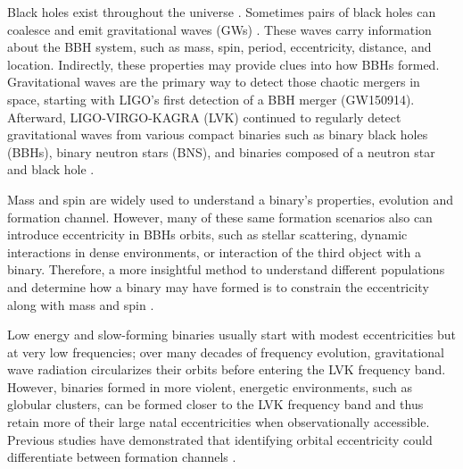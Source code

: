 \documentclass[twocolumn,prd,nofootinbib]{revtex4}
\begin{document}
Black holes exist throughout the universe \cite{Frolic_BH_Book_2011}.   Sometimes pairs of black holes can coalesce and emit gravitational waves (GWs) \cite{Frolic_BH_Book_2011,Indrajit_GW_intro_1999}. These waves carry information about the BBH system, such as mass, spin, period, eccentricity, distance, and location. Indirectly, these properties may provide clues into how BBHs formed.  Gravitational waves are the primary way to detect those chaotic mergers in space, starting with LIGO's \cite{LIGO_2015} first detection of a BBH merger (GW150914). Afterward, LIGO-VIRGO-KAGRA (LVK) \cite{LIGO_2015, VIRGO_2012, Virgo-2015,kagra-2013} continued to regularly detect gravitational waves from various compact binaries such as binary black holes (BBHs), binary neutron stars (BNS), and binaries composed of a neutron star and black hole \cite{gwtc-1-2019,gwtc-2-2020,gwtc-2.1-2021,gwtc-3-2021}.


Mass and spin are widely used to understand a binary's properties, evolution and formation channel.  
However, many of these same formation scenarios also can introduce eccentricity in BBHs orbits, such as stellar scattering, dynamic interactions in dense environments, or interaction of the third object with a binary. Therefore, a more insightful method to understand different populations and determine how a binary may have formed is to constrain the eccentricity along with mass and spin \cite{Rod-2018, zevin-samsing-2019, samsing-2018, Rodriguez-2018, Antonini-2014}.  


Low energy and slow-forming binaries usually start with modest eccentricities but at very low frequencies; over many decades of frequency evolution, gravitational wave radiation circularizes their orbits \cite{Peters-1964} before entering the LVK frequency band. However, binaries formed in more violent, energetic environments, such as globular clusters, can be formed closer to the LVK frequency band and thus retain more of their large natal eccentricities when observationally accessible.   Previous studies have demonstrated that identifying  orbital eccentricity could differentiate between formation channels \cite{Rod-2018,zevin-samsing-2019,samsing-2018, Rodriguez-2018,Antonini-2014}. 
\end{document}
